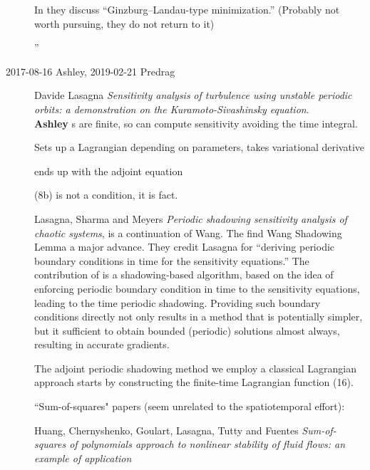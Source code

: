 \begin{description}
{In  they discuss ``Ginzburg–Landau-type minimization.''
(Probably not worth pursuing, they do not return to it)

''    }


\item[2017-08-16 Ashley, 2019-02-21 Predrag]
Davide Lasagna
{\em Sensitivity analysis} {\em of turbulence using unstable periodic orbits:
a demonstration on the {Kuramoto-Sivashinsky} equation}.
\\
{\bf  Ashley}
\Po s are finite, so can compute sensitivity avoiding the time integral.

Sets up a Lagrangian depending on parameters, takes variational derivative

ends up with the adjoint equation

(8b) is not a condition, it is fact.

Lasagna, Sharma and Meyers {\em Periodic shadowing sensitivity
analysis of chaotic systems},  is a continuation of
Wang. The find Wang Shadowing Lemma a major advance.
They credit Lasagna for ``deriving periodic boundary conditions in
time for the sensitivity equations.''
The contribution of  is a shadowing-based algorithm, based on
the idea of enforcing periodic boundary condition in time to the sensitivity
equations, leading to the time periodic shadowing. Providing such boundary
conditions directly not only results in a method that is potentially simpler, but
it sufficient to obtain bounded (periodic) solutions almost always, resulting in
accurate gradients.

The adjoint periodic shadowing method we employ a classical Lagrangian
approach starts by constructing the finite-time Lagrangian
function (16).

``Sum-of-squares" papers (seem unrelated to the spatiotemporal effort):

Huang, Chernyshenko, Goulart, Lasagna, Tutty and Fuentes
{\em Sum-of-squares of polynomials approach to nonlinear stability of
fluid flows: an example of application}


\end{description}
